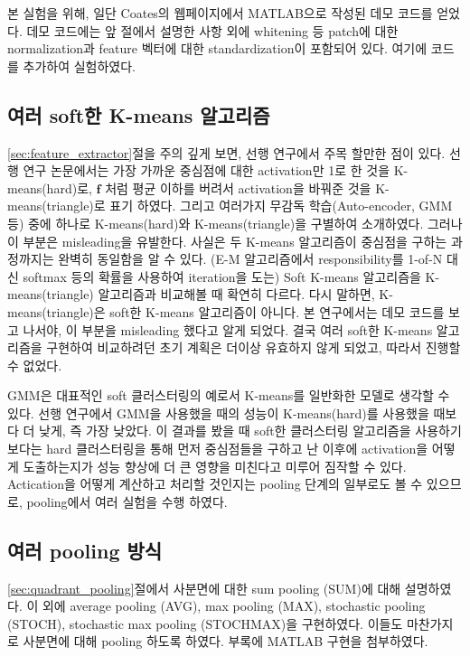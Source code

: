 \documentclass[a4paper,9pt]{article}
\begin{document}
\begin{multicols}{2}
본 실험을 위해, 일단 Coates의 웹페이지에서 MATLAB으로 작성된 데모 코드를 얻었다.
데모 코드에는 앞 절에서 설명한 사항 외에 whitening 등 patch에 대한 normalization과 feature 벡터에 대한 standardization이 포함되어 있다.
여기에 코드를 추가하여 실험하였다.

\subsection{여러 soft한 K-means 알고리즘}

\ref{sec:feature_extractor}절을 주의 깊게 보면, 선행 연구에서 주목 할만한 점이 있다.
선행 연구 논문에서는 가장 가까운 중심점에 대한 activation만 1로 한 것을 K-means(hard)로, $\mathbf{f}$ 처럼 평균 이하를 버려서 activation을 바꿔준 것을 K-means(triangle)로 표기 하였다.
그리고 여러가지 무감독 학습(Auto-encoder, GMM 등) 중에 하나로 K-means(hard)와 K-means(triangle)을 구별하여 소개하였다.
그러나 이 부분은 misleading을 유발한다.
사실은 두 K-means 알고리즘이 중심점을 구하는 과정까지는 완벽히 동일함을 알 수 있다.
(E-M 알고리즘에서 responsibility를 1-of-N 대신 softmax 등의 확률을 사용하여 iteration을 도는) Soft K-means 알고리즘을 K-means(triangle) 알고리즘과 비교해볼 때 확연히 다르다.
다시 말하면, K-means(triangle)은 soft한 K-means 알고리즘이 아니다.
본 연구에서는 데모 코드를 보고 나서야, 이 부분을 misleading 했다고 알게 되었다.
결국 여러 soft한 K-means 알고리즘을 구현하여 비교하려던 초기 계획은 더이상 유효하지 않게 되었고, 따라서 진행할 수 없었다.

GMM은 대표적인 soft 클러스터링의 예로서 K-means를 일반화한 모델로 생각할 수 있다.
선행 연구에서 GMM을 사용했을 때의 성능이 K-means(hard)를 사용했을 때보다 더 낮게, 즉 가장 낮았다.
이 결과를 봤을 때 soft한 클러스터링 알고리즘을 사용하기 보다는 hard 클러스터링을 통해 먼저 중심점들을 구하고 난 이후에 activation을 어떻게 도출하는지가 성능 향상에 더 큰 영향을 미친다고 미루어 짐작할 수 있다.
Actication을 어떻게 계산하고 처리할 것인지는 pooling 단계의 일부로도 볼 수 있으므로, pooling에서 여러 실험을 수행 하였다.

\subsection{여러 pooling 방식}

\ref{sec:quadrant_pooling}절에서 사분면에 대한 sum pooling (SUM)에 대해 설명하였다.
이 외에 average pooling (AVG), max pooling (MAX), stochastic pooling (STOCH), stochastic max pooling (STOCHMAX)을 구현하였다.
이들도 마찬가지로 사분면에 대해 pooling 하도록 하였다.
부록에 MATLAB 구현을 첨부하였다.


\end{multicols}
\end{document}
